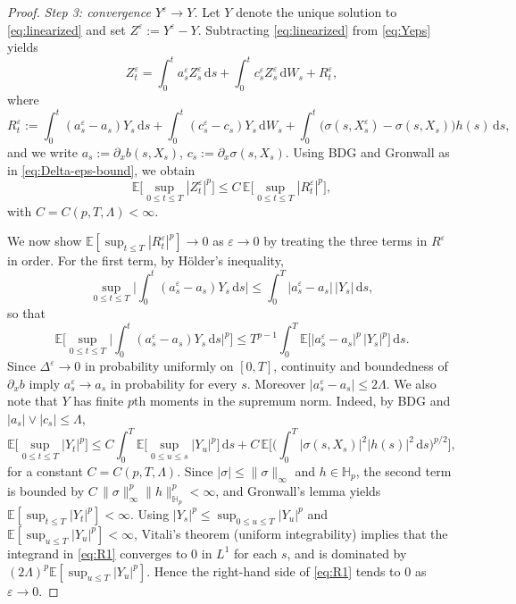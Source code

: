 \documentclass[10pt,a4paper]{amsart}
\newcommand{\E}{\mathbb{E}}
\newcommand{\Hb}{\mathbb{H}}
\newcommand{\dd}{\mathrm{d}}
\begin{document}
\begin{proof}
\medskip
\noindent\emph{Step 3: convergence $Y^\varepsilon\to Y$.}
Let $Y$ denote the unique solution to \eqref{eq:linearized} and set $Z^\varepsilon:=Y^\varepsilon-Y$.
Subtracting \eqref{eq:linearized} from \eqref{eq:Yeps} yields
\[
Z_t^\varepsilon=\int_0^t a_s^\varepsilon Z_s^\varepsilon\,\dd s+\int_0^t c_s^\varepsilon Z_s^\varepsilon\,\dd W_s+R_t^\varepsilon,
\]
where
\[
R_t^\varepsilon:=\int_0^t (a_s^\varepsilon-a_s)Y_s\,\dd s+\int_0^t (c_s^\varepsilon-c_s)Y_s\,\dd W_s
+\int_0^t \big(\sigma(s,X_s^\varepsilon)-\sigma(s,X_s)\big)h(s)\,\dd s,
\]
and we write $a_s:=\partial_x b(s,X_s)$, $c_s:=\partial_x\sigma(s,X_s)$.
Using BDG and Gronwall as in \eqref{eq:Delta-eps-bound}, we obtain
\begin{equation}\label{eq:Zeps-gron}
\E\Big[\sup_{0\le t\le T}|Z_t^\varepsilon|^p\Big]\le C\,\E\Big[\sup_{0\le t\le T}|R_t^\varepsilon|^p\Big],
\end{equation}
with $C=C(p,T,\Lambda)<\infty$.

We now show $\E[\sup_{t\le T}|R_t^\varepsilon|^p]\to0$ as $\varepsilon\to0$ by treating the three terms in $R^\varepsilon$ in order.
For the first term, by H\"older's inequality,
\[
\sup_{0\le t\le T}\Big|\int_0^t (a_s^\varepsilon-a_s)Y_s\,\dd s\Big|
\le \int_0^T |a_s^\varepsilon-a_s|\,|Y_s|\,\dd s,
\]
so that
\begin{equation}\label{eq:R1}
\E\Big[\sup_{0\le t\le T}\Big|\int_0^t (a_s^\varepsilon-a_s)Y_s\,\dd s\Big|^p\Big]
\le T^{p-1}\int_0^T \E\big[|a_s^\varepsilon-a_s|^p\,|Y_s|^p\big]\,\dd s.
\end{equation}
Since $\Delta^\varepsilon\to0$ in probability uniformly on $[0,T]$, continuity and boundedness of $\partial_x b$ imply $a_s^\varepsilon\to a_s$ in probability for every $s$.
Moreover $|a_s^\varepsilon-a_s|\le 2\Lambda$.
We also note that $Y$ has finite $p$th moments in the supremum norm. Indeed, by BDG and $|a_s|\vee|c_s|\le \Lambda$,
\[
\E\Big[\sup_{0\le t\le T}|Y_t|^p\Big]
\le C\int_0^T \E\Big[\sup_{0\le u\le s}|Y_u|^p\Big]\,\dd s
+ C\,\E\Big[\Big(\int_0^T |\sigma(s,X_s)|^2|h(s)|^2\,\dd s\Big)^{p/2}\Big],
\]
for a constant $C=C(p,T,\Lambda)$.
Since $|\sigma|\le \|\sigma\|_\infty$ and $h\in \Hb_p$, the second term is bounded by $C\,\|\sigma\|_\infty^p\|h\|_{\Hb_p}^p<\infty$, and Gronwall's lemma yields $\E[\sup_{t\le T}|Y_t|^p]<\infty$.
Using $|Y_s|^p\le \sup_{0\le u\le T}|Y_u|^p$ and $\E[\sup_{u\le T}|Y_u|^p]<\infty$,
Vitali's theorem (uniform integrability) implies that the integrand in \eqref{eq:R1} converges to $0$ in $L^1$ for each $s$,
and is dominated by $(2\Lambda)^p\E[\sup_{u\le T}|Y_u|^p]$.
Hence the right-hand side of \eqref{eq:R1} tends to $0$ as $\varepsilon\to0$.


\end{proof}
\end{document}
